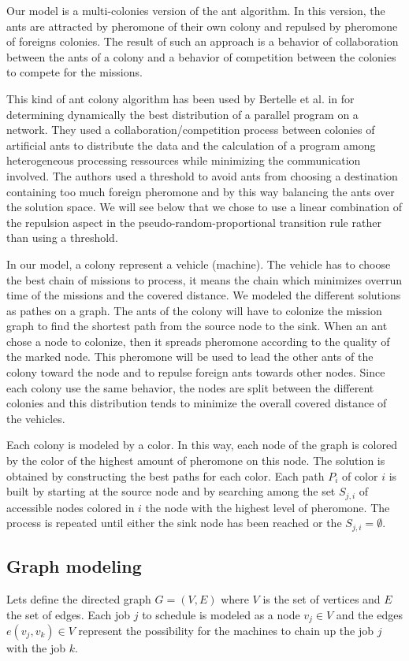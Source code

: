 \documentclass[a4paper,10pt]{article}
\begin{document}
Our model is a multi-colonies version of the ant algorithm. In this version, the ants are attracted by pheromone of their own colony and repulsed by pheromone of foreigns colonies. The result of such an approach is a behavior of collaboration between the ants of a colony and a behavior of competition between the colonies to compete for the missions.

This kind of ant colony algorithm has been used by Bertelle et al. in \cite{Bertelle2006,Bertelle2007} for determining dynamically the best distribution of a parallel program on a network. They used a collaboration/competition process between colonies of artificial ants to distribute the data and the calculation of a program among heterogeneous processing ressources while minimizing the communication involved. The authors used a threshold to avoid ants from choosing a destination containing too much foreign pheromone and by this way balancing the ants over the solution space. We will see below that we chose to use a linear combination of the repulsion aspect in the pseudo-random-proportional transition rule rather than using a threshold.

In our model, a colony represent a vehicle (machine). The vehicle has to choose the best chain of missions to process, it means the chain which minimizes overrun time of the missions and the covered distance. We modeled the different solutions as pathes on a graph. The ants of the colony will have to colonize the mission graph to find the shortest path from the source node to the sink. When an ant chose a node to colonize, then it spreads pheromone according to the quality of the marked node. This pheromone will be used to lead the other ants of the colony toward the node and to repulse foreign ants towards other nodes.
Since each colony use the same behavior, the nodes are split between the different colonies and this distribution tends to minimize the overall covered distance of the vehicles.

Each colony is modeled by a color. In this way, each node of the graph is colored by the color of the highest amount of pheromone on this node. The solution is obtained by constructing the best paths for each color. Each path $P_i$ of color $i$ is built by starting at the source node and by searching among the set $S_{j,i}$ of accessible nodes colored in $i$ the node with the highest level of pheromone. The process is repeated until either the sink node has been reached or the $S_{j,i} = \emptyset$.

\subsection{Graph modeling}
Lets define the directed graph $G = (V,E)$ where $V$ is the set of vertices and $E$ the set of edges. Each job $j$ to schedule is modeled as a node $v_j \in V$ and the edges $e(v_j,v_k) \in V$ represent the possibility for the machines to chain up the job $j$ with the job $k$.
\end{document}

